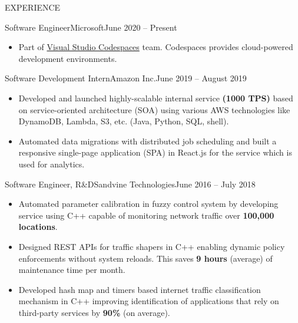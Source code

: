 \documentclass[]{mcdowellcv}
\begin{document}
	\begin{cvsection}{EXPERIENCE}
	    \begin{cvsubsection}{Software Engineer}{Microsoft}{June 2020 -- Present}
			\begin{itemize}
				\item Part of \href{https://visualstudio.microsoft.com/services/visual-studio-codespaces/}{Visual Studio Codespaces} team. Codespaces provides cloud-powered development environments. 
			\end{itemize}
		\end{cvsubsection}
		
	    \begin{cvsubsection}{Software Development Intern}{Amazon Inc.}{June 2019 -- August 2019}
			\begin{itemize}
				\item Developed and launched highly-scalable internal service \textbf{(1000 TPS)} based on service-oriented architecture (SOA) using various AWS technologies like DynamoDB, Lambda, S3, etc. (Java, Python, SQL, shell).
				\item Automated data migrations with distributed job scheduling and built a responsive single-page application (SPA) in React.js for the service which is used for analytics.
			\end{itemize}
		\end{cvsubsection}
		
		\begin{cvsubsection}{Software Engineer, R\&D}{Sandvine Technologies}{June 2016 -- July 2018}
			\begin{itemize}
				\item Automated parameter calibration in fuzzy control system by developing service using C++ capable of monitoring network traffic over \textbf{100,000 locations}.
				\item Designed REST APIs for traffic shapers in C++ enabling dynamic policy enforcements without system reloads. This saves \textbf{9 hours} (average) of maintenance time per month.
				\item Developed hash map and timers based internet traffic classification mechanism in C++ improving identification of applications that rely on third-party services by \textbf{90\%} (on average).
			\end{itemize}
		\end{cvsubsection}
	\end{cvsection}
	
\end{document}
